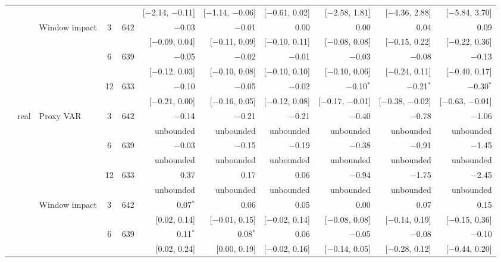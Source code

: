 \begin{table}[tp]
{\begin{tabular}{lllcrrrrrrr}
 & & & & & {\tiny [$-$2.14, $-$0.11]} & {\tiny [$-$1.14, $-$0.06]} & {\tiny [$-$0.61, 0.02]} & {\tiny [$-$2.58, 1.81]} & {\tiny [$-$4.36, 2.88]} & {\tiny [$-$5.84, 3.70]}\\
 &  & Window impact & 3 & 642 & $-$0.03 & $-$0.01 & 0.00 & 0.00 & 0.04 & 0.09\\
 & & & & & {\tiny [$-$0.09, 0.04]} & {\tiny [$-$0.11, 0.09]} & {\tiny [$-$0.10, 0.11]} & {\tiny [$-$0.08, 0.08]} & {\tiny [$-$0.15, 0.22]} & {\tiny [$-$0.22, 0.36]}\\
 &  &  & 6 & 639 & $-$0.05 & $-$0.02 & $-$0.01 & $-$0.03 & $-$0.08 & $-$0.13\\
 & & & & & {\tiny [$-$0.12, 0.03]} & {\tiny [$-$0.10, 0.08]} & {\tiny [$-$0.10, 0.10]} & {\tiny [$-$0.10, 0.06]} & {\tiny [$-$0.24, 0.11]} & {\tiny [$-$0.40, 0.17]}\\
 &  &  & 12 & 633 & $-$0.10 & $-$0.05 & $-$0.02 & $-$0.10$^{*}$ & $-$0.21$^{*}$ & $-$0.30$^{*}$\\
 & & & & & {\tiny [$-$0.21, 0.00]} & {\tiny [$-$0.16, 0.05]} & {\tiny [$-$0.12, 0.08]} & {\tiny [$-$0.17, $-$0.01]} & {\tiny [$-$0.38, $-$0.02]} & {\tiny [$-$0.63, $-$0.01]}\\
 & real & Proxy VAR & 3 & 642 & $-$0.14 & $-$0.21 & $-$0.21 & $-$0.40 & $-$0.78 & $-$1.06\\
 & & & & & {\tiny unbounded} & {\tiny unbounded} & {\tiny unbounded} & {\tiny unbounded} & {\tiny unbounded} & {\tiny unbounded}\\
 &  &  & 6 & 639 & $-$0.03 & $-$0.15 & $-$0.19 & $-$0.38 & $-$0.91 & $-$1.45\\
 & & & & & {\tiny unbounded} & {\tiny unbounded} & {\tiny unbounded} & {\tiny unbounded} & {\tiny unbounded} & {\tiny unbounded}\\
 &  &  & 12 & 633 & 0.37 & 0.17 & 0.06 & $-$0.94 & $-$1.75 & $-$2.45\\
 & & & & & {\tiny unbounded} & {\tiny unbounded} & {\tiny unbounded} & {\tiny unbounded} & {\tiny unbounded} & {\tiny unbounded}\\
 &  & Window impact & 3 & 642 & 0.07$^{*}$ & 0.06 & 0.05 & 0.00 & 0.07 & 0.15\\
 & & & & & {\tiny [0.02, 0.14]} & {\tiny [$-$0.01, 0.15]} & {\tiny [$-$0.02, 0.14]} & {\tiny [$-$0.08, 0.08]} & {\tiny [$-$0.14, 0.19]} & {\tiny [$-$0.15, 0.36]}\\
 &  &  & 6 & 639 & 0.11$^{*}$ & 0.08$^{*}$ & 0.06 & $-$0.05 & $-$0.08 & $-$0.10\\
 & & & & & {\tiny [0.02, 0.24]} & {\tiny [0.00, 0.19]} & {\tiny [$-$0.02, 0.16]} & {\tiny [$-$0.14, 0.05]} & {\tiny [$-$0.28, 0.12]} & {\tiny [$-$0.44, 0.20]}\\

\end{tabular}}
\end{table}
